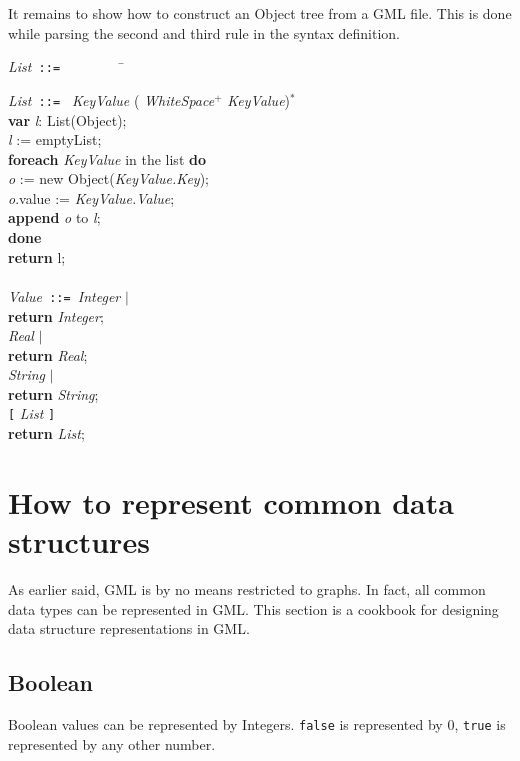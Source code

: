 It remains to show how to construct an Object tree from a GML file.  
This is done while parsing the second and third rule in the syntax 
definition.

\begin{tabbing}
\emph{List}\texttt{\ ::=\ }\=\texttt{\ \ \ \ }\=\texttt{\ \ \ \ }\=\kill

\emph{List}\texttt{\ ::=\ }
\emph{KeyValue} ( \emph{WhiteSpace}$^+$ \emph{KeyValue})$^{*}$ \\
\> \> \textbf{var} \emph{l}: List(Object); \\
\> \> \emph{l} := emptyList; \\
\> \> \textbf{foreach} \emph{KeyValue} in the list \textbf{do} \\
\> \> \> \emph{o} := new Object(\emph{KeyValue.Key}); \\
\> \> \> \emph{o}.value := \emph{KeyValue.Value}; \\
\> \> \> \textbf{append} \emph{o} to \emph{l}; \\
\> \> \textbf{done} \\
\> \> \textbf{return} l; \\

\\
\emph{Value}\texttt{\ ::=\ }\emph{Integer} $\mid$ \\
\> \> \textbf{return} \emph{Integer}; \\
\>\emph{Real} $\mid$ \\
\> \> \textbf{return} \emph{Real}; \\
\>\emph{String} $\mid$ \\
\> \> \textbf{return} \emph{String}; \\
\>\verb|[| \emph{List} \verb|]| \\
\> \> \textbf{return} \emph{List};
\end{tabbing}


\section{How to represent common data structures}

As earlier said, GML is by no means restricted to graphs. In
fact, all common data types can be represented in GML. This
section is a cookbook for designing data structure
representations in GML.

\subsection{Boolean}
Boolean values can be represented by Integers. \texttt{false} is
represented by 0, \texttt{true} is represented by any other
number.

